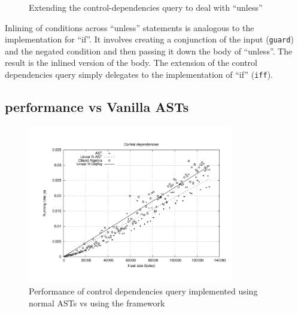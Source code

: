 \begin{figure}[tb]
\vspace{-.1in}
\caption{Extending the control-dependencies query to deal with ``unless''}
\label{controldeps_unless}
\end{figure}

Inlining of conditions across ``unless'' statements is analogous to the implementation for ``if''.
It involves creating a conjunction of the input (\lstinline{guard}) and the negated condition and then passing it down the body of ``unless''. The result is the inlined version of the body.
The extension of the control dependencies query simply delegates to the implementation of ``if'' (\lstinline{iff}). 

\subsection{\name performance vs Vanilla ASTs}


\begin{figure}
  \centering
  \includegraphics[width=0.8\textwidth]{plots/controldeps}
  \caption{Performance of control dependencies query implemented using normal ASTs vs using the \name framework\label{FIG:perfControlDeps}}
\end{figure}

